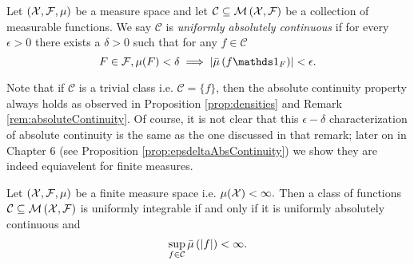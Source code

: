 \begin{defn}
\label{def:uniformAbsoluteContinuity}Let $\left(\mathcal{X},\mathcal{F},\mu\right)$
be a measure space and let $\mathcal{C}\subseteq\mathcal{M}\left(\mathcal{X},\mathcal{F}\right)$
be a collection of measurable functions. We say $\mathcal{C}$ is
\emph{uniformly absolutely continuous }if for every $\epsilon>0$
there exists a $\delta>0$ such that for any $f\in\mathcal{C}$
\[
F\in\F,\mu(F)<\delta\implies\lvert\lebInt{\mu}{f\indicate_{F}}\rvert<\epsilon.
\]
\end{defn}

\begin{rem}
\label{rem:uniformAbsoluteContinuity}Note that if $\mathcal{C}$
is a trivial class i.e. $\mathcal{C}=\{f\}$, then the absolute continuity
property always holds as observed in Proposition \ref{prop:densities}
and Remark \ref{rem:absoluteContinuity}. Of course, it is not clear
that this $\epsilon-\delta$ characterization of absolute continuity
is the same as the one discussed in that remark; later on in Chapter
6 (see Proposition \ref{prop:epsdeltaAbsContinuity}) we show they
are indeed equiavelent for finite measures.
\end{rem}

\begin{prop}
\label{prop:finiteMeasureUniformIntegrability}Let $\left(\mathcal{X},\mathcal{F},\mu\right)$
be a finite measure space i.e. $\mu(\mathcal{X})<\infty.$ Then a class of
functions $\mathcal{C}\subseteq\mathcal{M}\left(\mathcal{X},\mathcal{F}\right)$ is uniformly
integrable if and only if it is uniformly absolutely continuous and
\[
\sup_{f\in\mathcal{C}}\bar{\mu}\left(\lvert f\rvert\right)<\infty.
\]
\end{prop}

